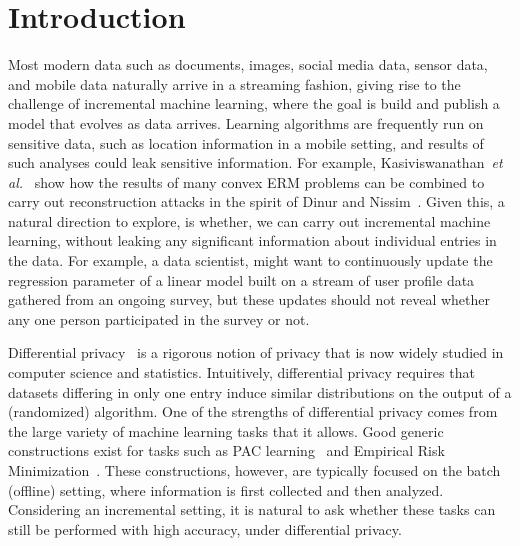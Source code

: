 \documentclass{article}
\theoremstyle{plain}
\begin{document}
\section{Introduction}
Most modern data such as documents, images, social media data, sensor data, and mobile data naturally arrive in a streaming fashion, giving rise to the challenge of incremental machine learning, where the goal is build and publish a model that evolves as data arrives. Learning algorithms are frequently run on sensitive data, such as location information in a mobile setting, and results of such analyses could leak sensitive information. For example, Kasiviswanathan~\emph{et al.}\ \cite{kasiviswanathan2013power} show how the results of many convex ERM problems can be combined to carry out reconstruction attacks in the spirit of Dinur and Nissim~\cite{DiNi03}. Given this, a natural direction to explore, is whether, we can carry out incremental machine learning, without leaking any significant information about individual entries in the data. For example, a data scientist, might want to continuously update the regression parameter of a linear model built on a stream of user profile data gathered from an ongoing survey, but these updates should not reveal whether any one person participated in the survey or not. 

Differential privacy~\cite{DMNS06} is a rigorous notion of privacy that is now widely studied in computer science and statistics. Intuitively, differential privacy requires that datasets differing in only one entry induce similar distributions on the output of a (randomized) algorithm. One of the strengths of differential privacy comes from the large variety of machine learning tasks that it allows. Good generic constructions exist for tasks such as PAC learning~\cite{BDMN05,KLNRS08} and Empirical Risk Minimization~\cite{rubinstein2009learning,kifer2012private,DBLP:journals/jmlr/JainKT12,jain2013differentially,thakurta2013differentially,jain2014near,bassily2014differentially,duchi2013local,ullman2015private,talwar2014private}. These constructions, however, are typically focused on  the batch (offline) setting, where information is first collected and then analyzed. Considering an incremental setting, it is natural to ask whether these tasks can still be performed with high accuracy, under differential privacy. 
\end{document}
